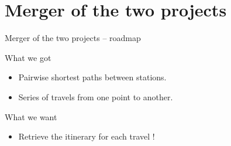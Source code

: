\section{Merger of the two projects}

\begin{frame}{Merger of the two projects -- roadmap}
	\begin{block}{What we got}
		\begin{itemize}
			\item Pairwise shortest paths between stations.
			\item Series of travels from one point to another.
		\end{itemize}
	\end{block}
	\begin{alertblock}{What we want}
		\begin{itemize}
			\item Retrieve the itinerary for each travel !
		\end{itemize}
	\end{alertblock}
\end{frame}


